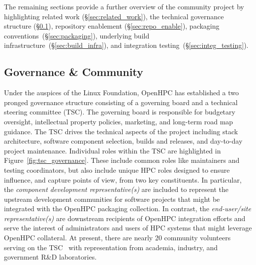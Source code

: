 \documentclass{sig-alternate-05-2015}
\begin{document}

The remaining sections provide a further overview of the community project
by highlighting related work (\S\ref{sec:related_work}), the technical governance
structure (\S\ref{sec:governance}), repository enablement (\S\ref{sec:repo_enable}), packaging
conventions~(\S\ref{sec:packaging}), underlying build
infrastructure~(\S\ref{sec:build_infra}), and integration testing~(\S\ref{sec:integ_testing}).

\newpage


\subsection{Governance \& Community} \label{sec:governance}
Under the auspices of the Linux Foundation, OpenHPC has established a two
pronged governance structure consisting of a governing board and a technical
steering committee (TSC). The governing board is responsible for budgetary
oversight, intellectual property policies, marketing, and long-term road map
guidance. The TSC drives the technical aspects of the project including stack
architecture, software component selection, builds and releases, and day-to-day
project maintenance. Individual roles within the TSC are highlighted in
Figure~\ref{fig:tsc_governance}.  These include common roles like maintainers
and testing coordinators, but also include unique HPC roles designed to ensure
influence, and capture points of view, from two key constituents. In particular,
the {\em component development representative(s)} are included to represent the
upstream development communities for software projects that might be integrated
with the OpenHPC packaging collection. In contrast, the {\em end-user/site
  representative(s)} are downstream recipients of OpenHPC integration efforts
and serve the interest of administrators and users of HPC systems that might leverage
OpenHPC collateral.  At present, there are nearly 20 community volunteers
serving on the TSC~\cite{TSC_url} with representation from academia, industry,
and government R\&D laboratories.

\end{document}
